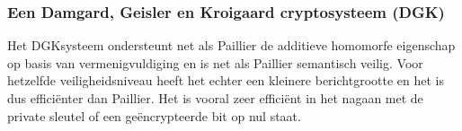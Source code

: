 \subsubsection{Een Damgard, Geisler en Kroigaard cryptosysteem (DGK)}
\label{dgk}
Het DGKsysteem ondersteunt net als Paillier de additieve homomorfe eigenschap op basis van vermenigvuldiging en is net als Paillier semantisch veilig. Voor hetzelfde veiligheidsniveau heeft het echter een kleinere berichtgrootte en het is dus effici\"enter dan Paillier. Het is vooral zeer effici\"ent in het nagaan met de private sleutel of een ge\"encrypteerde bit op nul staat.